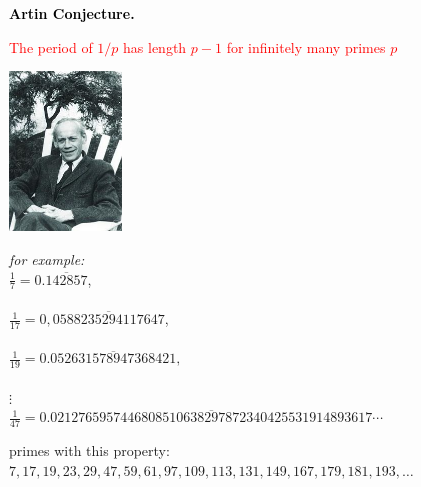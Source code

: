 \documentclass[landscape,display]{powersem} %
\newcommand{\heading}[1]{%
 \begin{center}
  \large\bf
  \shadowbox{{\textcolor{conceptcolor}{#1}}}%
 \end{center}
 \vspace{1ex minus 1ex}}
\begin{document}
\begin{slide}
\heading{Some conjectures regarding prime numbers: 4/5}\pause

\textcolor{black}{\textbf{Artin Conjecture.}} \pause

\textcolor{red}{ The period of $1/p$ has length $p-1$ for infinitely many primes $p$}\pause


 \includegraphics[width=3cm]{images/EmilArtin.jpg}\pause

\vspace{-4cm}
\hspace*{3.5cm}
\begin{minipage}{8cm}
\textit{for example:} \\
$\frac17=0.\overline{142857}$,\\
\\
$\frac1{17}=0,\overline{0588235294117647}$,\\
\\
$\frac1{19}=0.\overline{052631578947368421},$\\
\\
$\vdots $\\
$\frac1{47}=$\scriptsize{$0.\overline{0212765957446808510638297872340425531914893617} \cdots$}\end{minipage}\bigskip\bigskip\medskip\pause

\begin{scriptsize}
primes with this property: $7, 17, 19, 23, 29, 47, 59, 61, 97, 109, 113, 131, 149, 167, 179, 181, 193,\ldots$
\end{scriptsize}


\end{slide}
\end{document}

